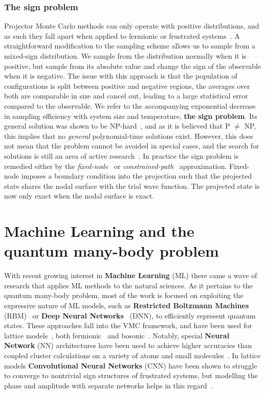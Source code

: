 \subsubsection{The sign problem}
Projector Monte Carlo methods can only operate with positive distributions, and as such they fall apart when applied to fermionic or frustrated systems~\cite{gubernatis_kawashima_werner_2016}. A straightforward modification to the sampling scheme allows us to sample from a mixed-sign distribution. We sample from the distribution normally when it is positive, but sample from its absolute value and change the sign of the observable when it is negative. The issue with this approach is that the population of configurations is split between positive and negative regions, the averages over both are comparable in size and cancel out, leading to a large statistical error compared to the observable. We refer to the accompanying exponential decrease~\cite{gubernatis_kawashima_werner_2016} in sampling efficiency with system size and temperature, \textbf{the sign problem}. Its general solution was shown to be NP-hard~\cite{troyer2005computational}, and as it is believed that P $\neq$ NP, this implies that no \emph{general} polynomial-time solutions exist. However, this does not mean that the problem cannot be avoided in special cases, and the search for solutions is still an area of active research~\cite{alexandru2020complex, assaraf2007fermion, hutcheon2020stochastic}. In practice the sign problem is remedied either by the \emph{fixed-node}~\cite{anderson1975random} or \emph{constrained-path}~\cite{zhang1997constrained} approximation. Fixed-node imposes a boundary condition into the projection such that the projected state shares the nodal surface with the trial wave function. The projected state is now only exact when the nodal surface is exact.

\section{Machine Learning and the quantum many-body problem}
With recent growing interest in \textbf{Machine Learning} (ML) there came a wave of research that applies ML methods to the natural sciences. As it pertains to the quantum many-body problem, most of the work is focused on exploiting the expressive nature of ML models, such as \textbf{Restricted Boltzmann Machines} (RBM)~\cite{carleo2017solving} or \textbf{Deep Neural Networks}~\cite{cai2018approximating} (DNN), to efficiently represent quantum states. These approaches fall into the VMC framework, and have been used for lattice models~\cite{carleo2017solving}, both fermionic~\cite{nomura2017restricted} and bosonic~\cite{saito2017solving}. Notably, special \textbf{Neural Network} (NN) architectures have been used to achieve higher accuracies than coupled cluster calculations on a variety of atoms and small molecules~\cite{pfau2020ab, spencer2020better}. In lattice models \textbf{Convolutional Neural Networks} (CNN) have been shown to struggle to converge to nontrivial sign structures of frustrated systems, but modelling the phase and amplitude with separate networks helps in this regard~\cite{szabo2020neural}.

